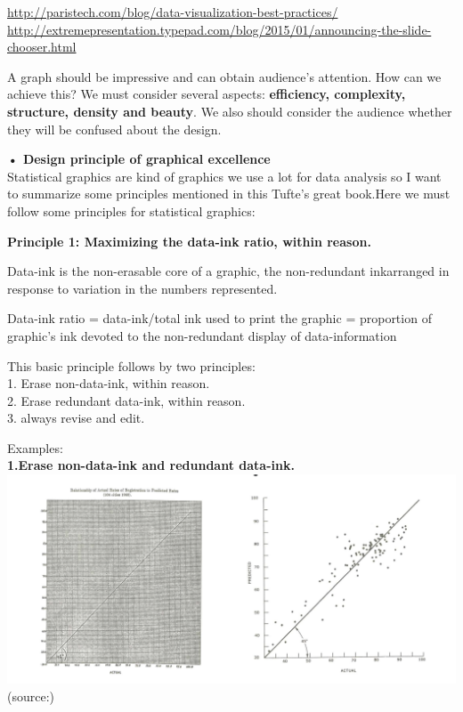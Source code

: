 \documentclass[]{book}
\theoremstyle{definition}
\theoremstyle{definition}
\theoremstyle{definition}
\theoremstyle{remark}
\begin{document}
\url{http://paristech.com/blog/data-visualization-best-practices/}\\
\url{http://extremepresentation.typepad.com/blog/2015/01/announcing-the-slide-chooser.html}

A graph should be impressive and can obtain audience's attention. How
can we achieve this? We must consider several aspects:
\textbf{efficiency, complexity, structure, density and beauty}. We also
should consider the audience whether they will be confused about the
design.

\textbf{• Design principle of graphical excellence}\\
Statistical graphics are kind of graphics we use a lot for data analysis
so I want to summarize some principles mentioned in this Tufte's great
book.Here we must follow some principles for statistical graphics:

\textbf{Principle 1: Maximizing the data-ink ratio, within reason.}

Data-ink is the non-erasable core of a graphic, the non-redundant
inkarranged in response to variation in the numbers represented.

Data-ink ratio = data-ink/total ink used to print the graphic =
proportion of graphic's ink devoted to the non-redundant display of
data-information

This basic principle follows by two principles:\\
1. Erase non-data-ink, within reason.\\
2. Erase redundant data-ink, within reason.\\
3. always revise and edit.

Examples:\\
\textbf{1.Erase non-data-ink and redundant data-ink.}\\
\includegraphics{images/Tufte_figure1.png} (source:\citep{Tufte_2001})
\end{document}
